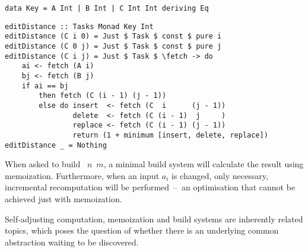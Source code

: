 \vspace{1mm}
\begin{verbatim}
data Key = A Int | B Int | C Int Int deriving Eq
\end{verbatim}
\begin{verbatim}
editDistance :: Tasks Monad Key Int
editDistance (C i 0) = Just $ Task $ const $ pure i
editDistance (C 0 j) = Just $ Task $ const $ pure j
editDistance (C i j) = Just $ Task $ \fetch -> do
    ai <- fetch (A i)
    bj <- fetch (B j)
    if ai == bj
        then fetch (C (i - 1) (j - 1))
        else do insert  <- fetch (C  i      (j - 1))
                delete  <- fetch (C (i - 1)  j     )
                replace <- fetch (C (i - 1) (j - 1))
                return (1 + minimum [insert, delete, replace])
editDistance _ = Nothing
\end{verbatim}
\vspace{1mm}

\noindent
When asked to build ~$n$~$m$, a minimal build system will calculate the
result using memoization. Furthermore, when an input $a_i$ is changed, only
necessary, incremental recomputation will be performed~--~an optimisation that
cannot be achieved just with memoization.

Self-adjusting computation, memoization and build systems are inherently related
topics, which poses the question of whether there is an underlying common
abstraction waiting to be discovered.
